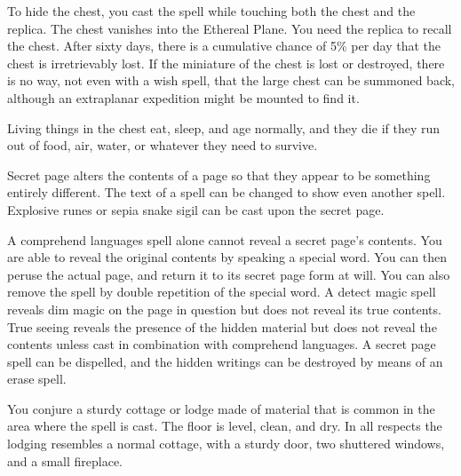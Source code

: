 \begin{multicols}{2}
\begin{small}
\smallskip\noindent To hide the chest, you cast the spell while touching both the chest and the replica. The chest vanishes into the Ethereal Plane. You need the replica to recall the chest. After sixty days, there is a cumulative chance of 5\% per day that the chest is irretrievably lost. If the miniature of the chest is lost or destroyed, there is no way, not even with a wish spell, that the large chest can be summoned back, although an extraplanar expedition might be mounted to find it.

\smallskip\noindent Living things in the chest eat, sleep, and age normally, and they die if they run out of food, air, water, or whatever they need to survive.


\noindent Secret page alters the contents of a page so that they appear to be something entirely different. The text of a spell can be changed to show even another spell. Explosive runes or sepia snake sigil can be cast upon the secret page.

\smallskip\noindent A comprehend languages spell alone cannot reveal a secret page's contents. You are able to reveal the original contents by speaking a special word. You can then peruse the actual page, and return it to its secret page form at will. You can also remove the spell by double repetition of the special word. A detect magic spell reveals dim magic on the page in question but does not reveal its true contents. True seeing reveals the presence of the hidden material but does not reveal the contents unless cast in combination with comprehend languages. A secret page spell can be dispelled, and the hidden writings can be destroyed by means of an erase spell.


\noindent You conjure a sturdy cottage or lodge made of material that is common in the area where the spell is cast. The floor is level, clean, and dry. In all respects the lodging resembles a normal cottage, with a sturdy door, two shuttered windows, and a small fireplace.


\end{small}
\end{multicols}
